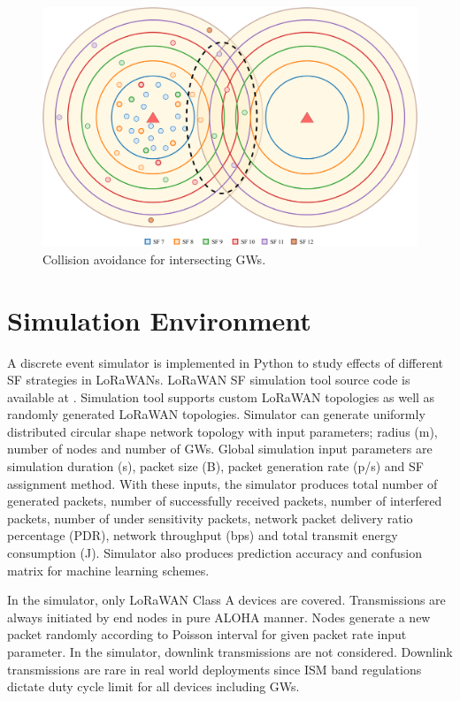 \documentclass[conference]{IEEEtran}
\begin{document}
\begin{figure}
\centering
\includegraphics[width=\linewidth]{collision_solution_multi_gw}
\caption{Collision avoidance for intersecting GWs.}
\label{fig:collision_solution_multi_gw}
\end{figure}


\section{Simulation Environment} \label{Simulation Environment}
\par A discrete event simulator is implemented in Python to study effects of different SF strategies in LoRaWANs. LoRaWAN SF simulation tool source code is available at \cite{simlorasf}. Simulation tool supports custom LoRaWAN topologies as well as randomly generated LoRaWAN topologies. Simulator can generate uniformly distributed circular shape network topology with input parameters; radius (m), number of nodes and number of GWs. Global simulation input parameters are simulation duration (s), packet size (B), packet generation rate (p/s) and SF assignment method. With these inputs, the simulator produces total number of generated packets, number of successfully received packets, number of interfered packets, number of under sensitivity packets, network packet delivery ratio percentage (PDR), network throughput (bps) and total transmit energy consumption (J). Simulator also produces prediction accuracy and confusion matrix for machine learning schemes.

\par In the simulator, only LoRaWAN Class A devices are covered. Transmissions are always initiated by end nodes in pure ALOHA manner. Nodes generate a new packet randomly according to Poisson interval for given packet rate input parameter. In the simulator, downlink transmissions are not considered. Downlink transmissions are rare in real world deployments since ISM band regulations dictate duty cycle limit for all devices including GWs.
\end{document}
